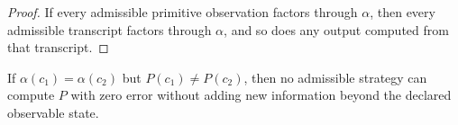 \begin{proof}
If every admissible primitive observation factors through $\alpha$, then every admissible transcript factors through $\alpha$, and so does any output computed from that transcript.
\end{proof}

\begin{corollary}\label{cor:fixed-axis-incompleteness}
If $\alpha(c_1)=\alpha(c_2)$ but $P(c_1)\neq P(c_2)$, then no admissible strategy can compute $P$ with zero error without adding new information beyond the declared observable state.
\end{corollary}

